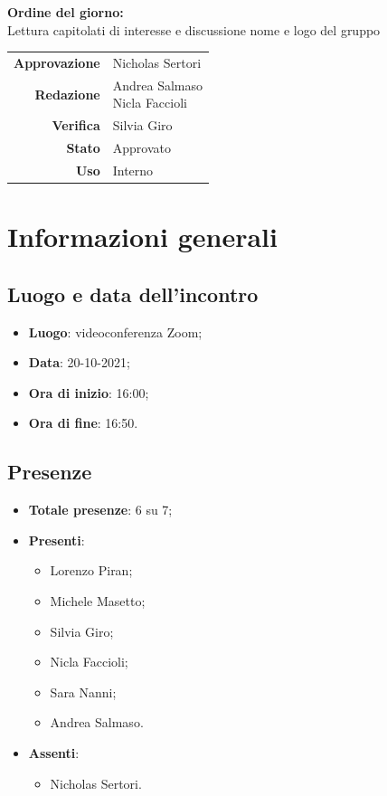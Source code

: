 \documentclass[11pt]{article}
\begin{document}
\begin{titlepage}
\begin{center}
			\large
			
			\vfill
			\textbf{Ordine del giorno:} \\
			Lettura capitolati di interesse e discussione nome e logo del gruppo
			\vfill
			
			\begin{tabular}{r|l}
				\textbf{Approvazione} &  Nicholas Sertori\\
				\textbf{Redazione} &  \parbox[t]{3.5cm}{Andrea Salmaso \\Nicla Faccioli}\\
				\textbf{Verifica} &  Silvia Giro\\
				\textbf{Stato} & Approvato \\
				\textbf{Uso} & Interno
			\end{tabular}
			\vfill
			
		\end{center}
	\end{titlepage}

	\newpage

	\section{Informazioni generali}
	\subsection{Luogo e data dell'incontro}
	\begin{itemize}
		\item \textbf{Luogo}: videoconferenza Zoom;
		\item \textbf{Data}: 20-10-2021;
		\item \textbf{Ora di inizio}: 16:00;
		\item \textbf{Ora di fine}: 16:50.
	\end{itemize}
	
	\subsection{Presenze}
	\begin{itemize}
		\item \textbf{Totale presenze}: 6 su 7;
		\item \textbf{Presenti}:
		\begin{itemize}
			\item Lorenzo Piran; 
			\item Michele Masetto;
			\item Silvia Giro;
			\item Nicla Faccioli;
			\item Sara Nanni;
			\item Andrea Salmaso.
			
		\end{itemize}
		\item \textbf{Assenti}:
			\begin{itemize}
				\item Nicholas Sertori.
			\end{itemize}
	\end{itemize}
	
\end{document}

